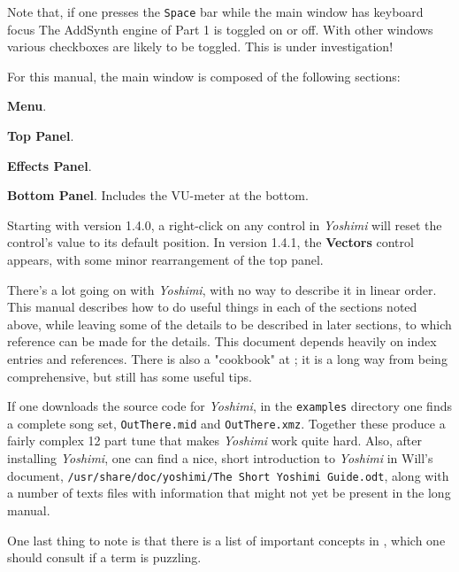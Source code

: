\documentclass[
 11pt,
 twoside,
 a4paper,
 final                                 %
]{article}
\begin{document}
   Note that, if one presses the \texttt{Space} bar while the main window has
   keyboard focus The AddSynth engine of Part 1 is toggled on or off. With other
   windows various checkboxes are likely to be toggled. This is under investigation!

   For this manual, the main window is composed of the following sections:

\begin{enumber}
   \item \textbf{Menu}.
   \item \textbf{Top Panel}.
   \item \textbf{Effects Panel}.
   \item \textbf{Bottom Panel}.  Includes the VU-meter at the bottom.
\end{enumber}

   Starting with version 1.4.0, a right-click on any control in \textsl{Yoshimi}
   will reset the control's value to its default position.  In version 1.4.1, the \textbf{Vectors} control appears, with some minor rearrangement of the top panel.

   There's a lot going on with \textsl{Yoshimi}, with no way to describe
   it in linear order.  This manual describes how to do useful things in
   each of the sections noted above, while leaving some of the details to be
   described in later sections, to which reference can be made for the details.
   This document depends heavily on index entries and references.
   There is also a "cookbook" at \cite{book}; it is a long way from being
   comprehensive, but still has some useful tips.

   If one downloads the source code for \textsl{Yoshimi}, in the
   \texttt{examples} directory one finds a complete song set,
   \texttt{OutThere.mid} and \texttt{OutThere.xmz}. Together these produce a
   fairly complex 12 part tune that makes \textsl{Yoshimi} work quite hard.
   Also, after installing \textsl{Yoshimi}, one can find a nice, short
   introduction to \textsl{Yoshimi} in Will's document,
   \texttt{/usr/share/doc/yoshimi/The Short Yoshimi Guide.odt},
   along with a number of texts files with information that might not yet be
   present in the long manual.

   One last thing to note is that there is a list of important concepts in
   , which one should consult if a term is puzzling.

\rhead{\rightmark}         %
\end{document}
